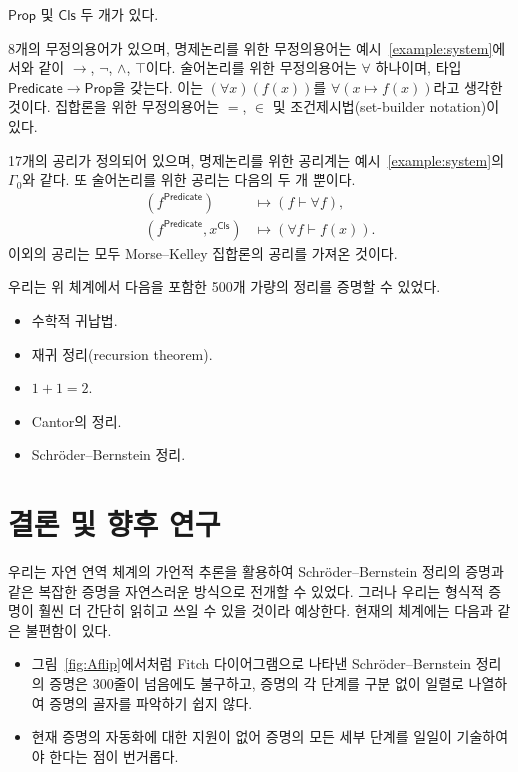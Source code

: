 \documentclass[10pt,twocolumn]{article}
\theoremstyle{definition}
\newcommand{\Prop}{\mathsf{Prop}}
\newcommand{\Cls}{\mathsf{Cls}}
\newcommand{\Predicate}{\mathsf{Predicate}}
\begin{document}
\begin{description}[leftmargin=0cm]
	\item[원시 타입.] $\Prop$ 및 $\Cls$ 두 개가 있다.
	\item[무정의용어.] 8개의 무정의용어가 있으며, 명제논리를 위한 무정의용어는 예시~\ref{example:system}에서와 같이 $\to$, $\neg$, $\land$, $\top$이다. 술어논리를 위한 무정의용어는 $\forall$ 하나이며, 타입 $\Predicate\to\Prop$을 갖는다. 이는 $(\forall x)(f(x))$를 $\forall(x\mapsto f(x))$라고 생각한 것이다. 집합론을 위한 무정의용어는 $=$, $\in$ 및 조건제시법(set-builder notation)이 있다.
	\item[공리계.] 17개의 공리가 정의되어 있으며, 명제논리를 위한 공리계는 예시~\ref{example:system}의 $\Gamma_0$와 같다. 또 술어논리를 위한 공리는 다음의 두 개 뿐이다.
	\begin{align*}
		(f^\Predicate)&\mapsto (f\vdash\forall f), \\
		(f^\Predicate, x^\Cls)&\mapsto (\forall f\vdash f(x)).
	\end{align*}
	이외의 공리는 모두 Morse--Kelley 집합론의 공리를 가져온 것이다.
\end{description}

우리는 위 체계에서 다음을 포함한 500개 가량의 정리를 증명할 수 있었다.

\begin{itemize}
	\item 수학적 귀납법.
	\item 재귀 정리(recursion theorem).
	\item $1+1=2$.
	\item Cantor의 정리.
	\item Schr\"oder--Bernstein 정리.
\end{itemize}

\section{결론 및 향후 연구}

우리는 자연 연역 체계의 가언적 추론을 활용하여 Schr\"oder--Bernstein 정리의 증명과 같은 복잡한 증명을 자연스러운 방식으로 전개할 수 있었다. 그러나 우리는 형식적 증명이 훨씬 더 간단히 읽히고 쓰일 수 있을 것이라 예상한다. 현재의 체계에는 다음과 같은 불편함이 있다.

\begin{itemize}
	\item 그림~\ref{fig:Aflip}에서처럼 Fitch 다이어그램으로 나타낸 Schr\"oder--Bernstein 정리의 증명은 300줄이 넘음에도 불구하고, 증명의 각 단계를 구분 없이 일렬로 나열하여 증명의 골자를 파악하기 쉽지 않다.
	\item 현재 증명의 자동화에 대한 지원이 없어 증명의 모든 세부 단계를 일일이 기술하여야 한다는 점이 번거롭다.
\end{itemize}
\end{document}
